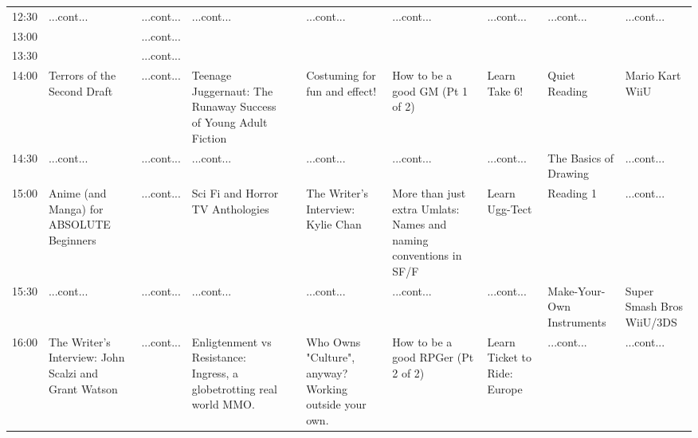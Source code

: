 \documentclass{scrreprt}
\begin{document}
\begin{landscape}
\begin{tabular}{c||p{25mm}|p{25mm}|p{25mm}|p{25mm}|p{25mm}|p{25mm}|p{25mm}|p{25mm}|p{25mm}|}
12:30&\cellcolor[gray]{0.894270} ...cont...&\cellcolor[gray]{0.625550} ...cont...&\cellcolor[gray]{0.785977} ...cont...&&\cellcolor[gray]{0.501949} ...cont...&\cellcolor[gray]{0.552033} ...cont...&\cellcolor[gray]{0.537581} ...cont...&\cellcolor[gray]{0.973893} ...cont...&\cellcolor[gray]{0.577648} ...cont...\\
13:00&&\cellcolor[gray]{0.625550} ...cont...&&&&&&&\\
13:30&&\cellcolor[gray]{0.625550} ...cont...&&&&&&&\\
14:00&\cellcolor[gray]{0.807678} Terrors of the Second Draft&\cellcolor[gray]{0.625550} ...cont...&\cellcolor[gray]{0.555982} Teenage Juggernaut: The Runaway Success of Young Adult Fiction&&\cellcolor[gray]{0.936680} Costuming for fun and effect!&\cellcolor[gray]{0.522875} How to be a good GM (Pt 1 of 2)&\cellcolor[gray]{0.684648} Learn Take 6!&\cellcolor[gray]{0.941676} Quiet Reading&\cellcolor[gray]{0.679036} Mario Kart WiiU\\
14:30&\cellcolor[gray]{0.807678} ...cont...&\cellcolor[gray]{0.625550} ...cont...&\cellcolor[gray]{0.555982} ...cont...&&\cellcolor[gray]{0.936680} ...cont...&\cellcolor[gray]{0.522875} ...cont...&\cellcolor[gray]{0.684648} ...cont...&\cellcolor[gray]{0.968020} The Basics of Drawing&\cellcolor[gray]{0.679036} ...cont...\\
15:00&\cellcolor[gray]{0.843109} Anime (and Manga) for ABSOLUTE Beginners&\cellcolor[gray]{0.625550} ...cont...&\cellcolor[gray]{0.781173} Sci Fi and Horror TV Anthologies&&\cellcolor[gray]{0.614105} The Writer's Interview: Kylie Chan&\cellcolor[gray]{0.958161} More than just extra Umlats: Names and naming conventions in SF/F&\cellcolor[gray]{0.869315} Learn Ugg-Tect&\cellcolor[gray]{0.996586} Reading 1&\cellcolor[gray]{0.679036} ...cont...\\
15:30&\cellcolor[gray]{0.843109} ...cont...&\cellcolor[gray]{0.625550} ...cont...&\cellcolor[gray]{0.781173} ...cont...&&\cellcolor[gray]{0.614105} ...cont...&\cellcolor[gray]{0.958161} ...cont...&\cellcolor[gray]{0.869315} ...cont...&\cellcolor[gray]{0.519485} Make-Your-Own Instruments&\cellcolor[gray]{0.616328} Super Smash Bros WiiU/3DS\\
16:00&\cellcolor[gray]{0.506255} The Writer's Interview: John Scalzi and Grant Watson&\cellcolor[gray]{0.625550} ...cont...&\cellcolor[gray]{0.733047} Enligtenment vs Resistance: Ingress, a globetrotting real world MMO.&&\cellcolor[gray]{0.865034} Who Owns "Culture", anyway? Working outside your own.&\cellcolor[gray]{0.666507} How to be a good RPGer (Pt 2 of 2)&\cellcolor[gray]{0.754827} Learn Ticket to Ride: Europe&\cellcolor[gray]{0.519485} ...cont...&\cellcolor[gray]{0.616328} ...cont...\\

\end{tabular}
\end{landscape}
\end{document}
